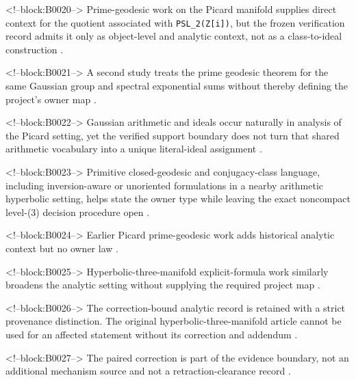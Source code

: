 \documentclass[11pt,a4paper]{article}
\begin{document}
<!--block:B0020-->
Prime-geodesic work on the Picard manifold supplies direct context for the quotient associated with \texttt{PSL\_2(Z{[}i{]})}, but the frozen verification record admits it only as object-level and analytic context, not as a class-to-ideal construction
\citep{P29-S01}.

<!--block:B0021-->
A second study treats the prime geodesic theorem for the same Gaussian group and spectral exponential sums without thereby defining the project's owner map
\citep{P29-S02}.

<!--block:B0022-->
Gaussian arithmetic and ideals occur naturally in analysis of the Picard setting, yet the verified support boundary does not turn that shared arithmetic vocabulary into a unique literal-ideal assignment
\citep{P29-S03}.

<!--block:B0023-->
Primitive closed-geodesic and conjugacy-class language, including inversion-aware or unoriented formulations in a nearby arithmetic hyperbolic setting, helps state the owner type while leaving the exact noncompact level-(3) decision procedure open
\citep{P29-S08}.

<!--block:B0024-->
Earlier Picard prime-geodesic work adds historical analytic context but no owner law
\citep{P29-S04}.

<!--block:B0025-->
Hyperbolic-three-manifold explicit-formula work similarly broadens the analytic setting without supplying the required project map
\citep{P29-S05}.

<!--block:B0026-->
The correction-bound analytic record is retained with a strict provenance distinction. The original hyperbolic-three-manifold article cannot be used for an affected statement without its correction and addendum
\citep{P29-S06}.

<!--block:B0027-->
The paired correction is part of the evidence boundary, not an additional mechanism source and not a retraction-clearance record
\citep{P29-S07}.
\end{document}
